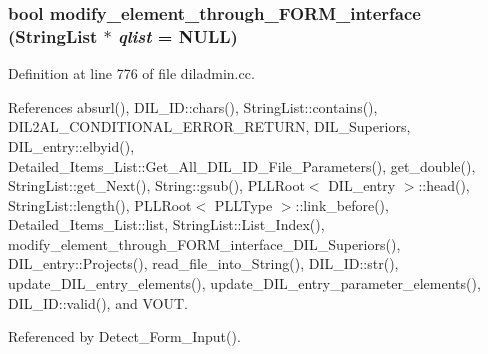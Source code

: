 \subsubsection{\setlength{\rightskip}{0pt plus 5cm}bool modify\_\-element\_\-through\_\-FORM\_\-interface ({\bf String\-List} $\ast$ {\em qlist} = NULL)}\label{dil2al_8hh_a303}




Definition at line 776 of file diladmin.cc.

References absurl(), DIL\_\-ID::chars(), String\-List::contains(), DIL2AL\_\-CONDITIONAL\_\-ERROR\_\-RETURN, DIL\_\-Superiors, DIL\_\-entry::elbyid(), Detailed\_\-Items\_\-List::Get\_\-All\_\-DIL\_\-ID\_\-File\_\-Parameters(), get\_\-double(), String\-List::get\_\-Next(), String::gsub(), PLLRoot$<$ DIL\_\-entry $>$::head(), String\-List::length(), PLLRoot$<$ PLLType $>$::link\_\-before(), Detailed\_\-Items\_\-List::list, String\-List::List\_\-Index(), modify\_\-element\_\-through\_\-FORM\_\-interface\_\-DIL\_\-Superiors(), DIL\_\-entry::Projects(), read\_\-file\_\-into\_\-String(), DIL\_\-ID::str(), update\_\-DIL\_\-entry\_\-elements(), update\_\-DIL\_\-entry\_\-parameter\_\-elements(), DIL\_\-ID::valid(), and VOUT.

Referenced by Detect\_\-Form\_\-Input().



